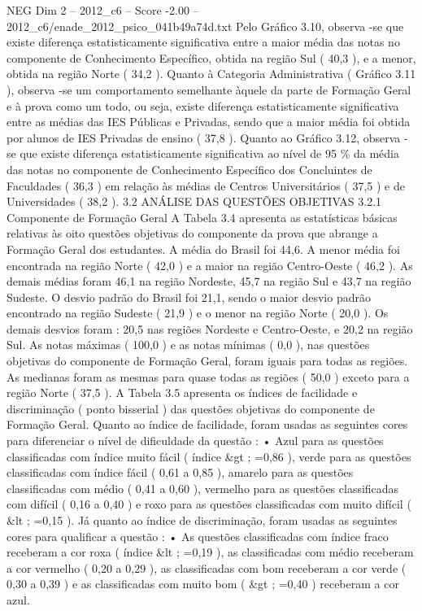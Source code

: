 \begin{textsample}{NEG Dim 2 – 2012\_c6 – Score -2.00 – 2012\_c6/enade\_2012\_psico\_041b49a74d.txt}
Pelo Gráfico 3.10, observa -se que existe diferença estatisticamente significativa entre a maior média das notas no componente de Conhecimento Específico, obtida na região Sul ( 40,3 ), e a menor, obtida na região Norte ( 34,2 ).
Quanto à Categoria Administrativa ( Gráfico 3.11 ), observa -se um comportamento semelhante àquele da parte de Formação Geral e à prova como um todo, ou seja, existe diferença estatisticamente significativa entre as médias das IES Públicas e Privadas, sendo que a maior média foi obtida por alunos de IES Privadas de ensino ( 37,8 ).
Quanto ao Gráfico 3.12, observa -se que existe diferença estatisticamente significativa ao nível de 95 \% da média das notas no componente de Conhecimento Específico dos Concluintes de Faculdades ( 36,3 ) em relação às médias de Centros Universitários ( 37,5 ) e de Universidades ( 38,2 ). 3.2 ANÁLISE DAS QUESTÕES OBJETIVAS 3.2.1 Componente de Formação Geral A Tabela 3.4 apresenta as estatísticas básicas relativas às oito questões objetivas do componente da prova que abrange a Formação Geral dos estudantes.
A média do Brasil foi 44,6.
A menor média foi encontrada na região Norte ( 42,0 ) e a maior na região Centro-Oeste ( 46,2 ).
As demais médias foram 46,1 na região Nordeste, 45,7 na região Sul e 43,7 na região Sudeste.
O desvio padrão do Brasil foi 21,1, sendo o maior desvio padrão encontrado na região Sudeste ( 21,9 ) e o menor na região Norte ( 20,0 ).
Os demais desvios foram : 20,5 nas regiões Nordeste e Centro-Oeste, e 20,2 na região Sul.
As notas máximas ( 100,0 ) e as notas mínimas ( 0,0 ), nas questões objetivas do componente de Formação Geral, foram iguais para todas as regiões.
As medianas foram as mesmas para quase todas as regiões ( 50,0 ) exceto para a região Norte ( 37,5 ).
A Tabela 3.5 apresenta os índices de facilidade e discriminação ( ponto bisserial ) das questões objetivas do componente de Formação Geral.
Quanto ao índice de facilidade, foram usadas as seguintes cores para diferenciar o nível de dificuldade da questão : • Azul para as questões classificadas com índice muito fácil ( índice \&gt ; =0,86 ), verde para as questões classificadas com índice fácil ( 0,61 a 0,85 ), amarelo para as questões classificadas com médio ( 0,41 a 0,60 ), vermelho para as questões classificadas com difícil ( 0,16 a 0,40 ) e roxo para as questões classificadas com muito difícil ( \&lt ; =0,15 ).
Já quanto ao índice de discriminação, foram usadas as seguintes cores para qualificar a questão : • As questões classificadas com índice fraco receberam a cor roxa ( índice \&lt ; =0,19 ), as classificadas com médio receberam a cor vermelho ( 0,20 a 0,29 ), as classificadas com bom receberam a cor verde ( 0,30 a 0,39 ) e as classificadas com muito bom ( \&gt ; =0,40 ) receberam a cor azul.

\end{textsample}
